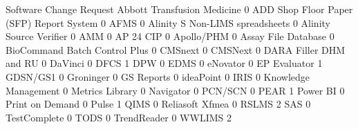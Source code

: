 \documentclass{article}
\begin{document}
\begin{Schunk}
\begin{Soutput}
                                           Software Change Request
  Abbott Transfusion Medicine                                    0
  ADD Shop Floor Paper (SFP) Report System                       0
  AFMS                                                           0
  Alinity S Non-LIMS spreadsheets                                0
  Alinity Source Verifier                                        0
  AMM                                                            0
  AP 24 CIP                                                      0
  Apollo/PHM                                                     0
  Assay File Database                                            0
  BioCommand Batch Control Plus                                  0
  CMSnext                                                        0
  CMSNext                                                        0
  DARA Filler DHM and RU                                         0
  DaVinci                                                        0
  DFCS                                                           1
  DPW                                                            0
  EDMS                                                           0
  eNovator                                                       0
  EP Evaluator                                                   1
  GDSN/GS1                                                       0
  Groninger                                                      0
  GS Reports                                                     0
  ideaPoint                                                      0
  IRIS                                                           0
  Knowledge Management                                           0
  Metrics Library                                                0
  Navigator                                                      0
  PCN/SCN                                                        0
  PEAR                                                           1
  Power BI                                                       0
  Print on Demand                                                0
  Pulse                                                          1
  QIMS                                                           0
  Reliasoft Xfmea                                                0
  RSLMS                                                          2
  SAS                                                            0
  TestComplete                                                   0
  TODS                                                           0
  TrendReader                                                    0
  WWLIMS                                                         2
                                          

\end{Soutput}
\end{Schunk}
\end{document}
